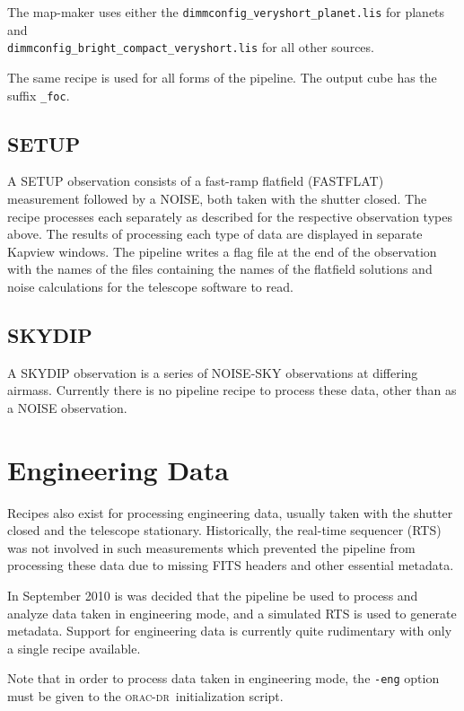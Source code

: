 \documentclass[twoside,11pt,nolof]{starlink}
\providecommand{\oracdr}{\textsc{orac-dr}}
\begin{document}
The map-maker uses either the \verb+dimmconfig_veryshort_planet.lis+
for planets and \\ \verb+dimmconfig_bright_compact_veryshort.lis+ for
all other sources.

The same recipe is used for all forms of the pipeline. The output cube
has the suffix \verb+_foc+.

\subsection{SETUP}

A SETUP observation consists of a fast-ramp flatfield (FASTFLAT)
measurement followed by a NOISE, both taken with the shutter
closed. The recipe processes each separately as described for the
respective observation types above. The results of processing each
type of data are displayed in separate Kapview windows. The pipeline
writes a flag file at the end of the observation with the names of the
files containing the names of the flatfield solutions and noise
calculations for the telescope software to read.

\subsection{SKYDIP}

A SKYDIP observation is a series of NOISE-SKY observations at
differing airmass. Currently there is no pipeline recipe to process
these data, other than as a NOISE observation.


\section{Engineering Data\label{se:eng}}

Recipes also exist for processing engineering data, usually taken with
the shutter closed and the telescope stationary. Historically, the
real-time sequencer (RTS) was not involved in such measurements which
prevented the pipeline from processing these data due to missing FITS
headers and other essential metadata.

In September 2010 is was decided that the pipeline be used to process
and analyze data taken in engineering mode, and a simulated RTS is
used to generate metadata. Support for engineering data is currently
quite rudimentary with only a single recipe available.

Note that in order to process data taken in engineering mode, the
\verb+-eng+ option must be given to the \oracdr\ initialization
script.
\end{document}
